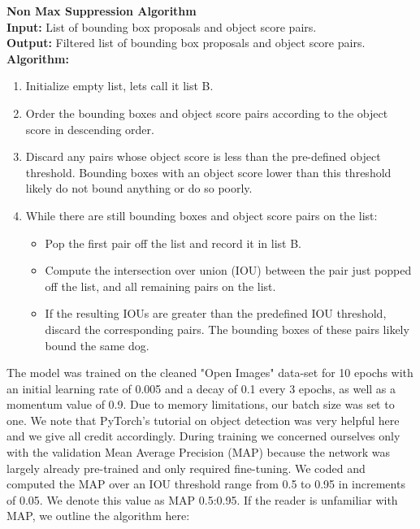 \documentclass{article}
\begin{document}
\begin{minipage}{1\textwidth}%
	\noindent \textbf{Non Max Suppression Algorithm} \\

  \noindent \textbf{Input:} List of bounding box proposals and object score pairs. \\
  
  \noindent \textbf{Output:} Filtered list of bounding box proposals and object score pairs. \\
  
  \noindent \textbf{Algorithm:} \\
\end{minipage}%

\begin{enumerate}

  \item Initialize empty list, lets call it list B.

  \item Order the bounding boxes and object score pairs according to the object score in descending order.
  
  \item Discard any pairs whose object score is less than the pre-defined object threshold.  Bounding boxes with an object score lower than this threshold likely do not bound anything or do so poorly.
  
  \item While there are still bounding boxes and object score pairs on the list:
        \begin{itemize}
             \item Pop the first pair off the list and record it in list B.            
             \item Compute the intersection over union (IOU) between the pair just popped off the list, and all remaining pairs on the list.
             \item If the resulting IOUs are greater than the predefined IOU threshold, discard the corresponding pairs.  The bounding boxes of these pairs likely bound the same dog.
        \end{itemize}
\end{enumerate}

The model was trained on the cleaned "Open Images" data-set for 10 epochs with an initial learning rate of 0.005 and a decay of 0.1 every 3 epochs, as well as a momentum value of 0.9.  Due to memory limitations, our batch size was set to one.  We note that PyTorch's tutorial on object detection \cite{TorchVision} was very helpful here and we give all credit accordingly.  During training we concerned ourselves only with the validation Mean Average Precision (MAP) because the network was largely already pre-trained and only required fine-tuning.  We coded and computed the MAP over an IOU threshold range from 0.5 to 0.95 in increments of 0.05.  We denote this value as MAP 0.5:0.95.   If the reader is unfamiliar with MAP, we outline the algorithm here: \\
\end{document}
